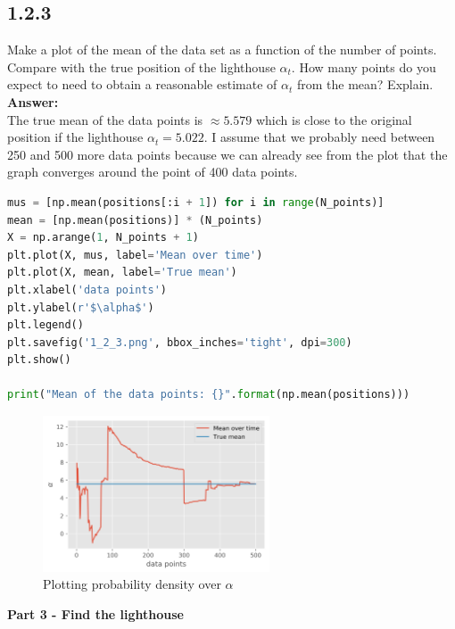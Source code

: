 \documentclass[a4paper]{article}
\begin{document}
\subsection*{1.2.3}

Make a plot of the mean of the data set as a function of the number of points. Compare with the true position of the lighthouse $\alpha_t$. How many points do you expect to need to obtain a reasonable estimate of $\alpha_t$ from the mean? Explain.\\

\textbf{Answer:}\\

The true mean of the data points is $\approx 5.579$ which is close to the original position if the lighthouse $\alpha_t = 5.022$. I assume that we probably need between 250 and 500 more data points because we can already see from the plot that the graph converges around the point of 400 data points.\\

\begin{lstlisting}[language=Python]
mus = [np.mean(positions[:i + 1]) for i in range(N_points)]
mean = [np.mean(positions)] * (N_points)
X = np.arange(1, N_points + 1)
plt.plot(X, mus, label='Mean over time')
plt.plot(X, mean, label='True mean')
plt.xlabel('data points')
plt.ylabel(r'$\alpha$')
plt.legend()
plt.savefig('1_2_3.png', bbox_inches='tight', dpi=300)
plt.show()

print("Mean of the data points: {}".format(np.mean(positions)))
\end{lstlisting}

\begin{figure}[H]
\center
\includegraphics[width=0.6\textwidth]{Images/1_2_3.png}
\caption{Plotting probability density over $\alpha$}
\label{fig:114}
\end{figure}

\textbf{Part 3 - Find the lighthouse}\\
\end{document}
